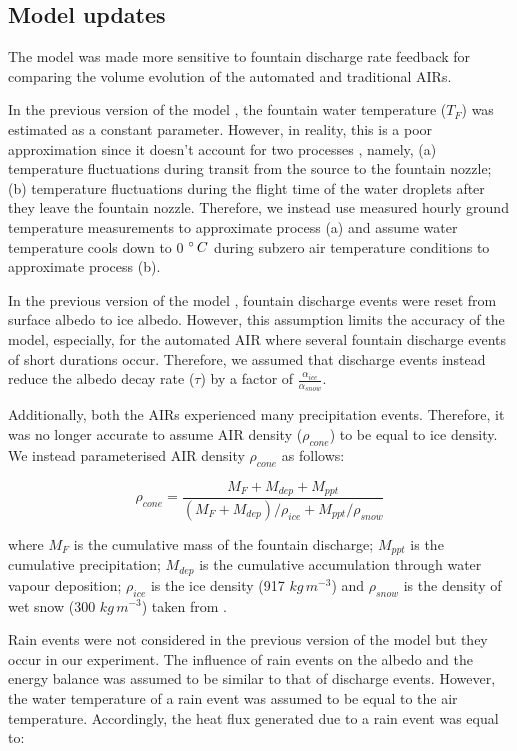 \documentclass[tc, manuscript]{copernicus}
\begin{document}
\subsection{Model updates}

The model was made more sensitive to fountain discharge rate feedback for comparing the volume evolution of the
automated and traditional AIRs. 

In the previous version of the model \citep{balasubramanianInfluenceMeteorologicalConditions2022}, the fountain
water temperature ($T_F$) was estimated as a constant parameter. However, in reality, this is a poor
approximation since it doesn't account for two processes , namely, (a) temperature fluctuations during transit
from the source to the fountain nozzle; (b) temperature fluctuations during the flight time of the water
droplets after they leave the fountain nozzle. Therefore, we instead use measured hourly ground temperature
measurements to approximate process (a) and assume water temperature cools down to 0 $^{\circ}\,C$ during subzero
air temperature conditions to approximate process (b).

In the previous version of the model \citep{balasubramanianInfluenceMeteorologicalConditions2022}, fountain
discharge events were reset from surface albedo to ice albedo. However, this assumption limits the accuracy of
the model, especially, for the automated AIR where several fountain discharge events of short durations occur.
Therefore, we assumed that discharge events instead reduce the albedo decay rate ($\tau$) by a 
factor of $\frac{\alpha_{ice}}{\alpha_{snow}}$.

Additionally, both the AIRs experienced many precipitation events. Therefore, it was no longer accurate to
assume AIR density ($\rho_{cone}$) to be equal to ice density. We instead parameterised AIR density $\rho_{cone}$ as follows:

\begin{equation}
  \rho_{cone} = \frac{M_{F} + M_{dep} + M_{ppt}}{(M_{F} + M_{dep})/\rho_{ice} + M_{ppt}/\rho_{snow}}
\end{equation}

where $M_F$ is the cumulative mass of the fountain discharge; $M_{ppt}$ is the cumulative precipitation;
$M_{dep}$ is the cumulative accumulation through water vapour deposition; $\rho_{ice}$ is the ice density (917
$kg\,m^{-3}$) and $\rho_{snow}$ is the density of wet snow (300 $kg\,m^{-3}$) taken from
\cite{cuffeyPhysicsGlaciers2010} .

Rain events were not considered in the previous version of the model but they occur in our experiment. The
influence of rain events on the albedo and the energy balance was assumed to be similar to that of discharge
events. However, the water temperature of a rain event was assumed to be equal to the air temperature.
Accordingly, the heat flux generated due to a rain event was equal to:
\end{document}
